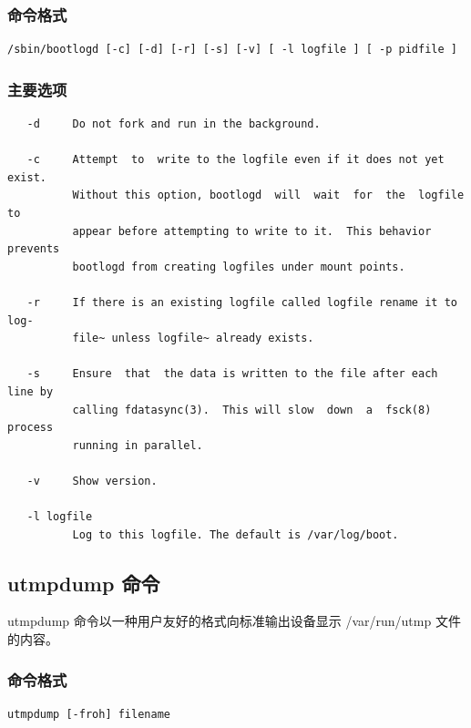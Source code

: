 \subsubsection{命令格式}

{\begin{shaded}\begin{verbatim}
/sbin/bootlogd [-c] [-d] [-r] [-s] [-v] [ -l logfile ] [ -p pidfile ]
\end{verbatim}\end{shaded}}
\subsubsection{主要选项}

{\begin{shaded}\begin{verbatim}
   -d     Do not fork and run in the background.

   -c     Attempt  to  write to the logfile even if it does not yet exist.
          Without this option, bootlogd  will  wait  for  the  logfile  to
          appear before attempting to write to it.  This behavior prevents
          bootlogd from creating logfiles under mount points.

   -r     If there is an existing logfile called logfile rename it to log‐
          file~ unless logfile~ already exists.

   -s     Ensure  that  the data is written to the file after each line by
          calling fdatasync(3).  This will slow  down  a  fsck(8)  process
          running in parallel.

   -v     Show version.

   -l logfile
          Log to this logfile. The default is /var/log/boot.
\end{verbatim}\end{shaded}}
\subsection{utmpdump 命令}

utmpdump 命令以一种用户友好的格式向标准输出设备显示 /var/run/utmp
文件的内容。

\subsubsection{命令格式}

{\begin{shaded}\begin{verbatim}
utmpdump [-froh] filename
\end{verbatim}\end{shaded}}
